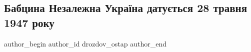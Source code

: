  
 
 
 
 
 
\subsection{Бабцина Незалежна Україна датується 28 травня 1947 року}
\label{sec:24_08_2021.fb.drozdov_ostap.1.nezalezhnist_babusja}
 
\ifcmt
 author_begin
   author_id drozdov_ostap
 author_end
\fi

